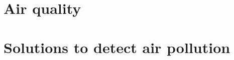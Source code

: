 	\section{Air quality}

	
	
	\section{Solutions to detect air pollution}
	
	
	\section{\megasense}\label{sec:megasense}
		
	
